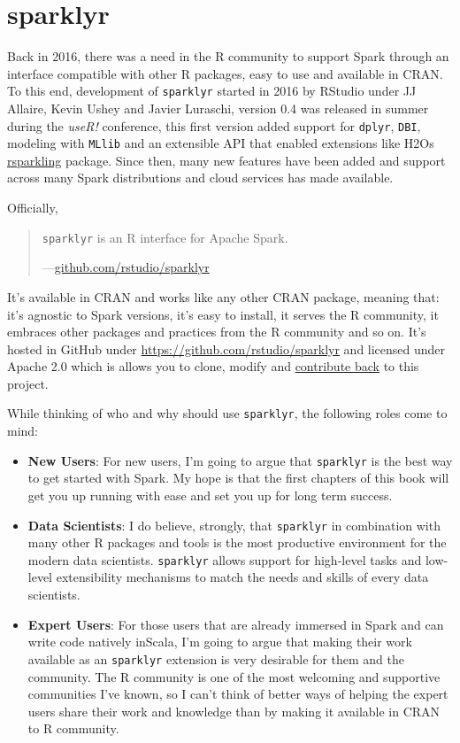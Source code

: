 \documentclass[]{book}
\providecommand{\tightlist}{%
  \setlength{\itemsep}{0pt}\setlength{\parskip}{0pt}}
\theoremstyle{definition}
\theoremstyle{definition}
\theoremstyle{definition}
\theoremstyle{remark}
\begin{document}
\hypertarget{sparklyr}{%
\section{sparklyr}\label{sparklyr}}

Back in 2016, there was a need in the R community to support Spark
through an interface compatible with other R packages, easy to use and
available in CRAN. To this end, development of \texttt{sparklyr} started
in 2016 by RStudio under JJ Allaire, Kevin Ushey and Javier Luraschi,
version 0.4 was released in summer during the \emph{useR!} conference,
this first version added support for \texttt{dplyr}, \texttt{DBI},
modeling with \texttt{MLlib} and an extensible API that enabled
extensions like H2Os
\href{https://github.com/h2oai/rsparkling/}{rsparkling} package. Since
then, many new features have been added and support across many Spark
distributions and cloud services has made available.

Officially,

\begin{quote}
\texttt{sparklyr} is an R interface for Apache Spark.

---\href{https://github.com/rstudio/sparklyr}{github.com/rstudio/sparklyr}
\end{quote}

It's available in CRAN and works like any other CRAN package, meaning
that: it's agnostic to Spark versions, it's easy to install, it serves
the R community, it embraces other packages and practices from the R
community and so on. It's hosted in GitHub under
\href{github.com/rstudio/sparklyr}{https://github.com/rstudio/sparklyr}
and licensed under Apache 2.0 which is allows you to clone, modify and
\href{contributing}{contribute back} to this project.

While thinking of who and why should use \texttt{sparklyr}, the
following roles come to mind:

\begin{itemize}
\tightlist
\item
  \textbf{New Users}: For new users, I'm going to argue that
  \texttt{sparklyr} is the best way to get started with Spark. My hope
  is that the first chapters of this book will get you up running with
  ease and set you up for long term success.
\item
  \textbf{Data Scientists}: I do believe, strongly, that
  \texttt{sparklyr} in combination with many other R packages and tools
  is the most productive environment for the modern data scientists.
  \texttt{sparklyr} allows support for high-level tasks and low-level
  extensibility mechanisms to match the needs and skills of every data
  scientists.
\item
  \textbf{Expert Users}: For those users that are already immersed in
  Spark and can write code natively inScala, I'm going to argue that
  making their work available as an \texttt{sparklyr} extension is very
  desirable for them and the community. The R community is one of the
  most welcoming and supportive communities I've known, so I can't think
  of better ways of helping the expert users share their work and
  knowledge than by making it available in CRAN to R community.
\end{itemize}
\end{document}
